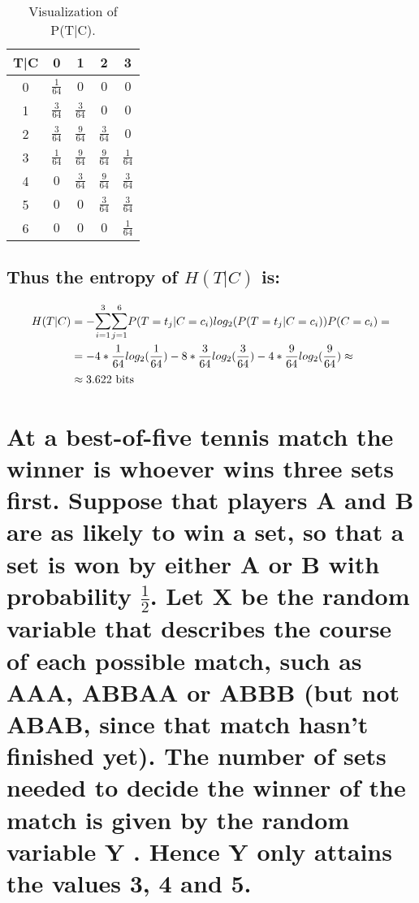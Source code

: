 \documentclass[11px]{article}
\begin{document}
\begin{table}[ht]
\centering
\begin{adjustbox}{width=0.5\linewidth}
\begin{tabular}{|c|c|c|c|c|}
\hline
T|C & 0 & 1 & 2 & 3\\ \hline
0 & \(\frac{1}{64}\) & \(0\) & \(0\) & \(0\)\\ \hline
1 & \(\frac{3}{64}\) & \(\frac{3}{64}\) & \(0\) & \(0\)\\ \hline
2 & \(\frac{3}{64}\) & \(\frac{9}{64}\) & \(\frac{3}{64}\) & \(0\) \\ \hline
3 &\(\frac{1}{64}\) & \(\frac{9}{64}\) & \(\frac{9}{64}\) & \(\frac{1}{64}\) \\ \hline
4 &\(0\) & \(\frac{3}{64}\) & \(\frac{9}{64}\) & \(\frac{3}{64}\) \\ \hline
5 &\(0\) & \(0\) & \(\frac{3}{64}\) & \(\frac{3}{64}\) \\ \hline
6 &\(0\) & \(0\) & \(0\) & \(\frac{1}{64}\) \\ \hline
\end{tabular}
\end{adjustbox}
\caption{Visualization of P(T|C). } 
\end{table}

\subsection*{Thus the entropy of \(H(T|C)\) is:}

\begin{equation}
\begin{split}
H(T|C) & = -\mathlarger{\sum}_{i=1}^{3}\mathlarger{\sum}_{j=1}^{6} P(T = t_j|C = c_i)log_2(P(T = t_j|C = c_i))P(C = c_i) = \\
& = -4*\frac{1}{64}log_2(\frac{1}{64}) - 8*\frac{3}{64}log_2(\frac{3}{64}) - 4*\frac{9}{64}log_2(\frac{9}{64}) \approx \\ 
& \approx 3.622 \text{ bits}
\end{split}
\end{equation}



\section{\normalfont At a best-of-five tennis match the winner is whoever wins three sets first. Suppose
that players A and B are as likely to win a set, so that a set is won by either A or B with probability \(\frac{1}{2}\). Let X be the random variable that describes the course of each possible match, such as AAA, ABBAA or ABBB (but not ABAB, since that match hasn't finished yet). The number of sets
needed to decide the winner of the match is given by the random variable Y . Hence Y only attains the values 3, 4 and 5.}
\end{document}
